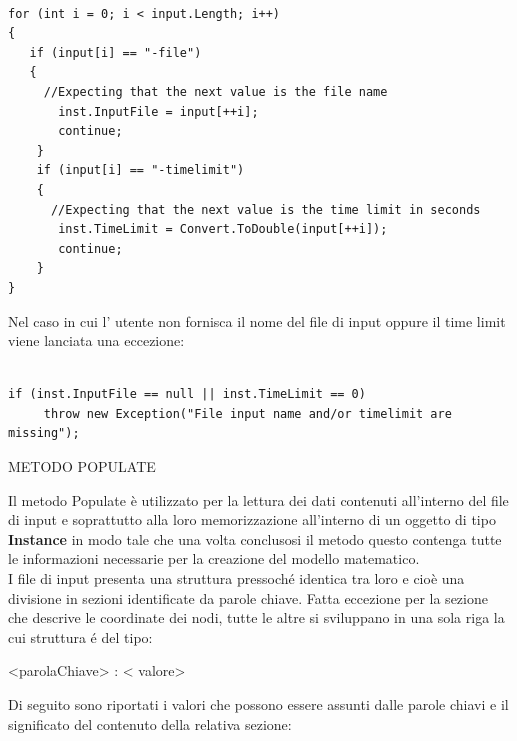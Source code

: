 \documentclass[11pt]{article}
\begin{document}
\begin{lstlisting}

for (int i = 0; i < input.Length; i++)
{
   if (input[i] == "-file")
   {
     //Expecting that the next value is the file name
       inst.InputFile = input[++i];
       continue;
    }
    if (input[i] == "-timelimit")
    {
      //Expecting that the next value is the time limit in seconds
       inst.TimeLimit = Convert.ToDouble(input[++i]);
       continue;
    }
}   			
\end{lstlisting}

Nel caso in cui l' utente non fornisca il nome del file di input oppure il time limit viene lanciata una eccezione:

\begin{lstlisting}

if (inst.InputFile == null || inst.TimeLimit == 0)
     throw new Exception("File input name and/or timelimit are missing");

\end{lstlisting}


\vspace{2\baselineskip}
METODO POPULATE
\vspace{2\baselineskip}

Il metodo Populate \`e utilizzato per la lettura dei dati contenuti all'interno del file di input e soprattutto alla loro memorizzazione all'interno di un oggetto di tipo \textbf{Instance} in modo tale che una volta conclusosi il metodo questo contenga tutte le informazioni necessarie per la creazione del modello matematico.\\
I file di input presenta una struttura pressoché identica tra loro e cioè una divisione in sezioni identificate da parole chiave. Fatta eccezione per la sezione che descrive le coordinate dei nodi, tutte le altre si sviluppano in una sola riga la cui struttura \'e del tipo:

\begin{center}
<parolaChiave> : < valore> 
\end{center}

Di seguito sono riportati i valori che possono essere assunti dalle parole chiavi e il significato del contenuto della relativa sezione: 
\end{document}

